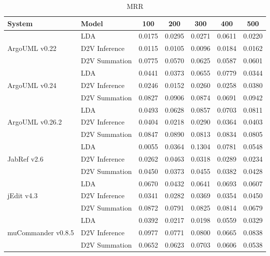 \begin{table*}
    \centering
\begin{tabular}{llccccc}
\toprule
System & Model &     100 &    200 &    300 &    400 &    500 \\
\midrule
                   &             LDA & 0.0175 & 0.0295 & 0.0271 & 0.0611 & 0.0220 \\
ArgoUML v0.22      & D2V Inference   & 0.0115 & 0.0105 & 0.0096 & 0.0184 & 0.0162 \\
                   & D2V Summation   & 0.0775 & 0.0570 & 0.0625 & 0.0587 & 0.0601 \\
                     \midrule
                   &             LDA & 0.0441 & 0.0373 & 0.0655 & 0.0779 & 0.0344 \\
ArgoUML v0.24      & D2V Inference   & 0.0246 & 0.0152 & 0.0260 & 0.0258 & 0.0380 \\
                   & D2V Summation   & 0.0827 & 0.0906 & 0.0874 & 0.0691 & 0.0942 \\
                     \midrule
                   &             LDA & 0.0493 & 0.0628 & 0.0857 & 0.0703 & 0.0811 \\
ArgoUML v0.26.2    & D2V Inference   & 0.0404 & 0.0218 & 0.0290 & 0.0364 & 0.0403 \\
                   & D2V Summation   & 0.0847 & 0.0890 & 0.0813 & 0.0834 & 0.0805 \\
                     \midrule
                   &             LDA & 0.0055 & 0.0364 & 0.1304 & 0.0781 & 0.0548 \\
JabRef v2.6        & D2V Inference   & 0.0262 & 0.0463 & 0.0318 & 0.0289 & 0.0234 \\
                   & D2V Summation   & 0.0450 & 0.0373 & 0.0455 & 0.0382 & 0.0428 \\
                     \midrule
                   &             LDA & 0.0670 & 0.0432 & 0.0641 & 0.0693 & 0.0607 \\
jEdit v4.3         & D2V Inference   & 0.0341 & 0.0282 & 0.0369 & 0.0354 & 0.0450 \\
                   & D2V Summation   & 0.0872 & 0.0791 & 0.0825 & 0.0814 & 0.0679 \\
                     \midrule
                   &             LDA & 0.0392 & 0.0217 & 0.0198 & 0.0559 & 0.0329 \\
muCommander v0.8.5 & D2V Inference   & 0.0977 & 0.0771 & 0.0800 & 0.0665 & 0.0838 \\
                   & D2V Summation   & 0.0652 & 0.0623 & 0.0703 & 0.0606 & 0.0538 \\

\bottomrule
\end{tabular}
\caption{MRR}
\label{tab:mrr}
\end{table*}
